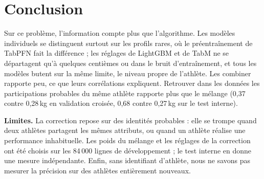 \documentclass[11pt,a4paper]{article}
\newcommand{\kg}{\,kg}
\begin{document}
\section{Conclusion}
Sur ce problème, l'information compte plus que l'algorithme. Les modèles individuels se distinguent surtout
sur les profils rares, où le préentraînement de TabPFN fait la différence ; les réglages de LightGBM et de TabM
ne se départagent qu'à quelques centièmes ou dans le bruit d'entraînement, et tous les modèles butent sur la
même limite, le niveau propre de l'athlète. Les combiner rapporte peu, ce que leurs corrélations expliquent.
Retrouver dans les données les participations probables du même athlète rapporte plus que le mélange
(0,37 contre 0,28\kg{} en validation croisée, 0,68 contre 0,27\kg{} sur le test interne).

\textbf{Limites.} La correction repose sur des identités probables : elle se trompe quand deux athlètes
partagent les mêmes attributs, ou quand un athlète réalise une performance inhabituelle. Les poids du mélange
et les réglages de la correction ont été choisis sur les 84\,000 lignes de développement ; le test interne en
donne une mesure indépendante. Enfin, sans identifiant d'athlète, nous ne savons pas mesurer la précision sur
des athlètes entièrement nouveaux.
\end{document}
